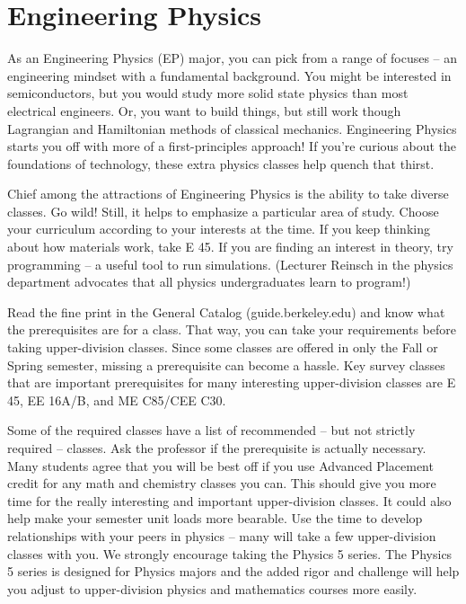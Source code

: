 \chapter*{Engineering Physics}

As an Engineering Physics (EP) major, you can pick from a range of focuses – an engineering mindset with a fundamental background. You might be interested in semiconductors, but you would study more solid state physics than most electrical engineers. Or, you want to build things, but still work though Lagrangian and Hamiltonian methods of classical mechanics. Engineering Physics starts you off with more of a first-principles approach! If you’re curious about the foundations of technology, these extra physics classes help quench that thirst.

Chief among the attractions of Engineering Physics is the ability to take diverse classes. Go wild! Still, it helps to emphasize a particular area of study. Choose your curriculum according to your interests at the time. If you keep thinking about how materials work, take E 45. If you are finding an interest in theory, try programming – a useful tool to run simulations. (Lecturer Reinsch in the physics department advocates that all physics undergraduates learn to program!)

Read the fine print in the General Catalog ({\selectfont guide.berkeley.edu}) and know what the prerequisites are for a class. That way, you can take your requirements before taking upper-division classes. Since some classes are offered in only the Fall or Spring semester, missing a prerequisite can become a hassle. Key survey classes that are important prerequisites for many interesting upper-division classes are E 45, EE 16A/B, and ME C85/CEE C30.

Some of the required classes have a list of recommended – but not strictly required – classes. Ask the professor if the prerequisite is actually necessary. Many students agree that you will be best off if you use Advanced Placement credit for any math and chemistry classes you can. This should give you more time for the really interesting and important upper-division classes. It could also help make your semester unit loads more bearable. Use the time to develop relationships with your peers in physics – many will take a few upper-division classes with you. We strongly encourage taking the Physics 5 series. The Physics 5 series is designed for Physics majors and the added rigor and challenge will help you adjust to upper-division physics and mathematics courses more easily.


